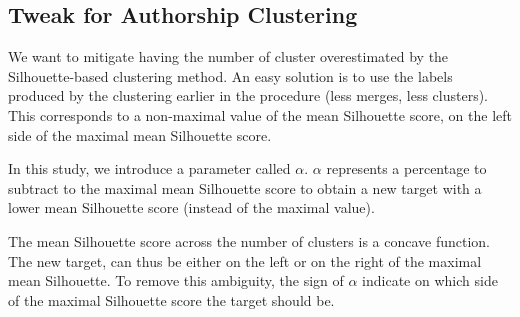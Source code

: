 \begin{table}
  \centering
  \caption{Silhouette-based clustering evaluation on retained rank lists, mean $B^3_{F_1}$/$r_{diff}$, Maximal Silhouette ($\alpha = 0$)}
  \label{tab:silhouette-based_clustering}

\end{table}

\subsection{Tweak for Authorship Clustering}

We want to mitigate having the number of cluster overestimated by the Silhouette-based clustering method.
An easy solution is to use the labels produced by the clustering earlier in the procedure (less merges, less clusters).
This corresponds to a non-maximal value of the mean Silhouette score, on the left side of the maximal mean Silhouette score.

In this study, we introduce a parameter called $\alpha$.
$\alpha$ represents a percentage to subtract to the maximal mean Silhouette score to obtain a new target with a lower mean Silhouette score (instead of the maximal value).

The mean Silhouette score across the number of clusters is a concave function.
The new target, can thus be either on the left or on the right of the maximal mean Silhouette.
To remove this ambiguity, the sign of $\alpha$ indicate on which side of the maximal Silhouette score the target should be.

